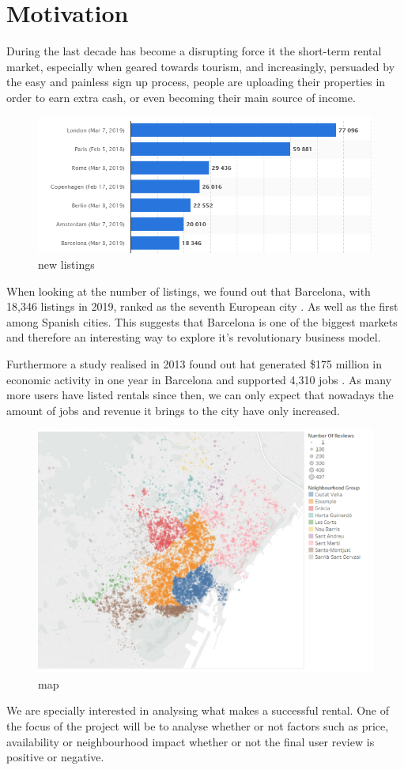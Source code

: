 

\section{Motivation}%
\label{sec:motivation}

During the last decade \airbnb has become a disrupting force it the 
short-term rental market, especially when geared towards tourism, and 
increasingly, persuaded by the easy and painless sign up process, people
are uploading their properties in order to earn extra cash, or even becoming 
their main source of income.

\begin{figure}[H]
    \centering
    \includegraphics[width=0.7\linewidth]{images/listingplot}
    \caption{ new listings}%
    \label{fig:airbnblistingsPlot.PNG}
\end{figure}

When looking at the number of \airbnb listings, we found out that Barcelona, 
with 18,346 listings in 2019, ranked as the seventh European city 
\cite{europe2019}. As well as the first among Spanish cities. This suggests
that Barcelona is one of the biggest \airbnb markets and therefore an 
interesting way to explore it's revolutionary business model.

Furthermore a study realised in 2013 found out hat \airbnb generated \$175
million in economic activity in one year in Barcelona and supported 4,310
jobs \cite{economy}. As many more users have listed rentals since then, we
can only expect that nowadays the amount of jobs and revenue it brings to 
the city have only increased.

\begin{figure}[H]
    \centering
    \includegraphics[width=0.6\linewidth]{images/airbnbMap}
    \caption{\airbnb map}%
    \label{fig:airbnbMap.PNG}
\end{figure}

We are specially interested in analysing what makes a successful \airbnb rental.
One of the focus of the project will be to analyse whether or not factors 
such as price, availability or neighbourhood impact whether or not the final
user review is positive or negative. 

